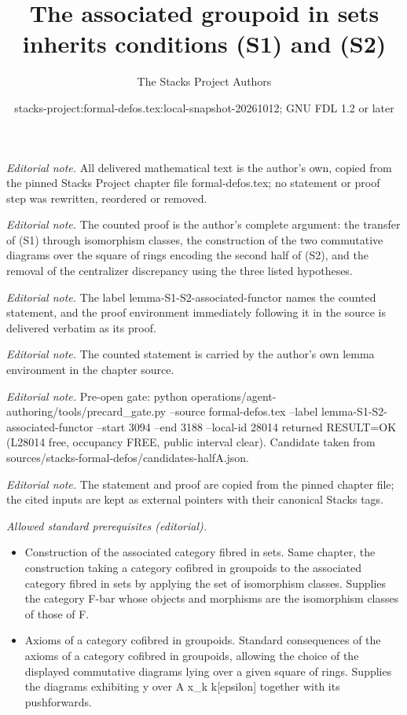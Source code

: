 \documentclass[10pt,a4paper]{amsart}
\title{The associated groupoid in sets inherits conditions (S1) and (S2)}
\author{The Stacks Project Authors}
\date{stacks-project:formal-defos.tex:local-snapshot-20261012; GNU FDL 1.2 or later}
\theoremstyle{plain}
\theoremstyle{definition}
\theoremstyle{remark}
\numberwithin{equation}{subsection}
\begin{document}
\maketitle
\noindent\textit{Editorial note.} All delivered mathematical text is the author's own, copied from the pinned Stacks Project chapter file formal-defos.tex; no statement or proof step was rewritten, reordered or removed.\par\medskip
\noindent\textit{Editorial note.} The counted proof is the author's complete argument: the transfer of (S1) through isomorphism classes, the construction of the two commutative diagrams over the square of rings encoding the second half of (S2), and the removal of the centralizer discrepancy using the three listed hypotheses.\par\medskip
\noindent\textit{Editorial note.} The label lemma-S1-S2-associated-functor names the counted statement, and the proof environment immediately following it in the source is delivered verbatim as its proof.\par\medskip
\noindent\textit{Editorial note.} The counted statement is carried by the author's own lemma environment in the chapter source.\par\medskip
\noindent\textit{Editorial note.} Pre-open gate: python operations/agent-authoring/tools/precard\_gate.py --source formal-defos.tex --label lemma-S1-S2-associated-functor --start 3094 --end 3188 --local-id 28014 returned RESULT=OK (L28014 free, occupancy FREE, public interval clear). Candidate taken from sources/stacks-formal-defos/candidates-halfA.json.\par\medskip
\noindent\textit{Editorial note.} The statement and proof are copied from the pinned chapter file; the cited inputs are kept as external pointers with their canonical Stacks tags.\par\medskip
\noindent\textit{Allowed standard prerequisites (editorial).}\begin{itemize}
\item Construction of the associated category fibred in sets. Same chapter, the construction taking a category cofibred in groupoids to the associated category fibred in sets by applying the set of isomorphism classes. Supplies the category F-bar whose objects and morphisms are the isomorphism classes of those of F.
\item Axioms of a category cofibred in groupoids. Standard consequences of the axioms of a category cofibred in groupoids, allowing the choice of the displayed commutative diagrams lying over a given square of rings. Supplies the diagrams exhibiting y over A x\_k k[epsilon] together with its pushforwards.
\end{itemize}\medskip
\end{document}
